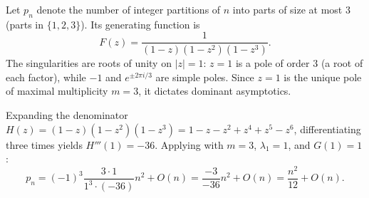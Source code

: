 \begin{example}
    \label{ex:partitions-3}
    Let \(p_n\) denote the number of integer partitions of \(n\) into parts of size at most \(3\) (parts in \(\{1, 2, 3\}\)).
    Its generating function is
    \[
        F(z) = \frac{1}{(1-z)(1-z^2)(1-z^3)}.
    \]
    The singularities are roots of unity on \(|z| = 1\):
    \(z = 1\) is a pole of order \(3\) (a root of each factor), while \(-1\) and \(e^{\pm 2\pi i/3}\) are simple poles.
    Since \(z = 1\) is the unique pole of maximal multiplicity \(m = 3\), it dictates dominant asymptotics.
    
    Expanding the denominator \(H(z) = (1-z)(1-z^2)(1-z^3) = 1 - z - z^2 + z^4 + z^5 - z^6\), differentiating three times yields \(H'''(1) = -36\).
    Applying  with \(m = 3\), \(\lambda_1 = 1\), and \(G(1) = 1\):
    \[
        p_n = (-1)^3 \frac{3 \cdot 1}{1^3 \cdot (-36)} n^2 + O(n) = \frac{-3}{-36} n^2 + O(n) = \frac{n^2}{12} + O(n).
    \]
\end{example}
